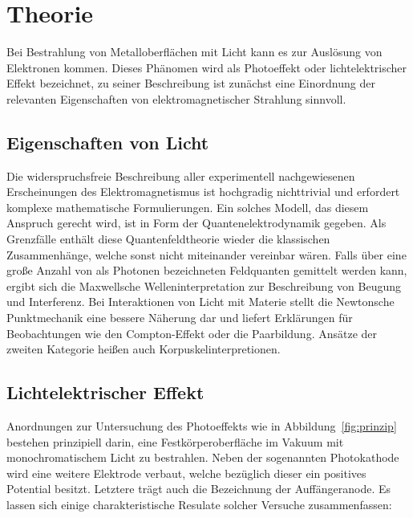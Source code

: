 \section[Theorie]{Theorie \textnormal{\cite{photo}}}
\label{sec:theorie}

Bei Bestrahlung von Metalloberflächen mit Licht kann es zur Auslösung von Elektronen kommen. Dieses Phänomen wird als Photoeffekt
oder lichtelektrischer Effekt bezeichnet, zu seiner Beschreibung ist zunächst eine Einordnung der relevanten Eigenschaften von
elektromagnetischer Strahlung sinnvoll.

\subsection{Eigenschaften von Licht}

Die widerspruchsfreie Beschreibung aller experimentell nachgewiesenen Erscheinungen des Elektromagnetismus ist hochgradig nichttrivial
und erfordert komplexe mathematische Formulierungen. Ein solches Modell, das diesem Anspruch gerecht wird, ist in Form der Quantenelektrodynamik
gegeben. Als Grenzfälle enthält diese Quantenfeldtheorie wieder die klassischen Zusammenhänge, welche sonst nicht miteinander
vereinbar wären. Falls über eine große Anzahl von als Photonen bezeichneten Feldquanten gemittelt werden kann, ergibt sich die
Maxwellsche Welleninterpretation zur Beschreibung von Beugung und Interferenz. Bei Interaktionen von Licht mit Materie stellt
die Newtonsche Punktmechanik eine bessere Näherung dar und liefert Erklärungen für Beobachtungen wie den Compton-Effekt oder
die Paarbildung. Ansätze der zweiten Kategorie heißen auch Korpuskelinterpretionen.

\subsection{Lichtelektrischer Effekt}

Anordnungen zur Untersuchung des Photoeffekts wie in Abbildung~\ref{fig:prinzip} bestehen prinzipiell darin, eine Festkörperoberfläche
im Vakuum mit monochromatischem Licht zu bestrahlen. Neben der sogenannten Photokathode wird eine weitere Elektrode verbaut, welche
bezüglich dieser ein positives Potential besitzt. Letztere trägt auch die Bezeichnung der Auffängeranode. Es lassen sich einige
charakteristische Resulate solcher Versuche zusammenfassen:

